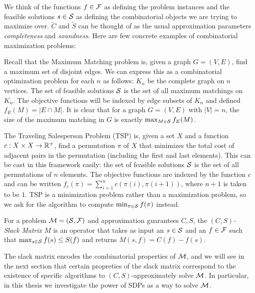 We think of the functions $f \in \mathcal F$ as defining the problem instances and the feasible solutions $s \in \mathcal S$ as defining the combinatorial objects we are 
trying to maximize over. $\tilde{C}$ and $\tilde{S}$ can be thought of as the usual approximation parameters \emph{completeness} and \emph{soundness}. Here are few concrete examples of combinatorial maximization problems:
\begin{example}
Recall that the Maximum Matching problem is, given a graph $G = (V,E)$, find a maximum set of disjoint edges. We can express this as a combinatorial optimization problem for each $n$ as follows: $K_n$ be the complete graph on $n$ vertices. The set of feasible solutions $\mathcal S$ is the set of all maximum matchings on $K_n$. The objective functions will be indexed by edge subsets of $K_n$ and defined $f_E(M) = |E \cap M|$. It is clear that for a graph $G = (V, E)$ with $|V| = n$, the size of the maximum matching in $G$ is exactly $\max_{M \in \mathcal S} f_E(M)$.
\end{example}
\begin{example}
The Traveling Salesperson Problem (TSP) is, given a set $X$ and a function $c: X\times X \rightarrow \mathbb R^+$, find a permutation $\pi$ of $X$ that minimizes the total cost of adjacent pairs in the permutation (including the first and last elements). This can be cast in this framework easily: the set of feasible solutions $\mathcal S$ is the set of all permutations of $n$ elements. The objective functions are indexed by the function $c$ and can be written $f_c(\pi) = \sum_{i=1}^n c(\pi(i),\pi(i+1))$, where $n+1$ is taken to be $1$. TSP is a minimization problem rather than a maximization problem, so we ask for the algorithm to compute $\min_{\pi \in \mathcal S} f(\pi)$ instead. 
\end{example}
\begin{definition}
For a problem $\mathcal M = (\mathcal S, \mathcal F)$ and approximation guarantees $C,S$, the \emph{$(C,S)$-Slack Matrix} $M$ is an operator that takes as input an $s \in \mathcal S$ and an $f \in \mathcal F$ such that $\max_{s \in \mathcal S} f(s) \leq S(f)$ and returns $M(s,f) = C(f) - f(s)$. 
\end{definition}
The slack matrix encodes the combinatorial properties of $\mathcal M$, and we will see in the next section that certain propreties of the slack matrix correspond to the existence of specific algorithms to $(C,S)$-approximately solve $\mathcal M$. In particular, in this thesis we investigate the power of SDPs as a way to solve $\mathcal M$. 

